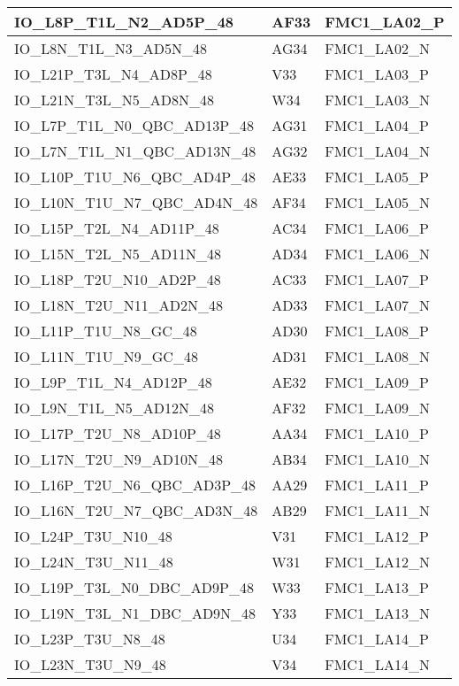 \begin{footnotesize}
\begin{longtable}{|p{7cm}|p{1cm}|p{5cm}|}
		IO\_L8P\_T1L\_N2\_AD5P\_48	&	AF33	&	FMC1\_LA02\_P	\\ \hline
		IO\_L8N\_T1L\_N3\_AD5N\_48	&	AG34	&	FMC1\_LA02\_N	\\ \hline
		IO\_L21P\_T3L\_N4\_AD8P\_48	&	V33	&	FMC1\_LA03\_P	\\ \hline
		IO\_L21N\_T3L\_N5\_AD8N\_48	&	W34	&	FMC1\_LA03\_N	\\ \hline
		IO\_L7P\_T1L\_N0\_QBC\_AD13P\_48	&	AG31	&	FMC1\_LA04\_P	\\ \hline
		IO\_L7N\_T1L\_N1\_QBC\_AD13N\_48	&	AG32	&	FMC1\_LA04\_N	\\ \hline
		IO\_L10P\_T1U\_N6\_QBC\_AD4P\_48	&	AE33	&	FMC1\_LA05\_P	\\ \hline
		IO\_L10N\_T1U\_N7\_QBC\_AD4N\_48	&	AF34	&	FMC1\_LA05\_N	\\ \hline
		IO\_L15P\_T2L\_N4\_AD11P\_48	&	AC34	&	FMC1\_LA06\_P	\\ \hline
		IO\_L15N\_T2L\_N5\_AD11N\_48	&	AD34	&	FMC1\_LA06\_N	\\ \hline
		IO\_L18P\_T2U\_N10\_AD2P\_48	&	AC33	&	FMC1\_LA07\_P	\\ \hline
		IO\_L18N\_T2U\_N11\_AD2N\_48	&	AD33	&	FMC1\_LA07\_N	\\ \hline
		IO\_L11P\_T1U\_N8\_GC\_48	&	AD30	&	FMC1\_LA08\_P	\\ \hline
		IO\_L11N\_T1U\_N9\_GC\_48	&	AD31	&	FMC1\_LA08\_N	\\ \hline
		IO\_L9P\_T1L\_N4\_AD12P\_48	&	AE32	&	FMC1\_LA09\_P	\\ \hline
		IO\_L9N\_T1L\_N5\_AD12N\_48	&	AF32	&	FMC1\_LA09\_N	\\ \hline
		IO\_L17P\_T2U\_N8\_AD10P\_48	&	AA34	&	FMC1\_LA10\_P	\\ \hline
		IO\_L17N\_T2U\_N9\_AD10N\_48	&	AB34	&	FMC1\_LA10\_N	\\ \hline
		IO\_L16P\_T2U\_N6\_QBC\_AD3P\_48	&	AA29	&	FMC1\_LA11\_P	\\ \hline
		IO\_L16N\_T2U\_N7\_QBC\_AD3N\_48	&	AB29	&	FMC1\_LA11\_N	\\ \hline
		IO\_L24P\_T3U\_N10\_48	&	V31	&	FMC1\_LA12\_P	\\ \hline
		IO\_L24N\_T3U\_N11\_48	&	W31	&	FMC1\_LA12\_N	\\ \hline
		IO\_L19P\_T3L\_N0\_DBC\_AD9P\_48	&	W33	&	FMC1\_LA13\_P	\\ \hline
		IO\_L19N\_T3L\_N1\_DBC\_AD9N\_48	&	Y33	&	FMC1\_LA13\_N	\\ \hline
		IO\_L23P\_T3U\_N8\_48	&	U34	&	FMC1\_LA14\_P	\\ \hline
		IO\_L23N\_T3U\_N9\_48	&	V34	&	FMC1\_LA14\_N	\\ \hline

\end{longtable}
\end{footnotesize}
